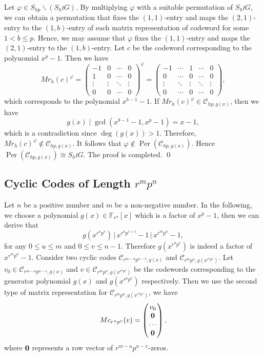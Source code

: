 \documentclass[journal,12pt,onecolumn]{IEEEtran}
\begin{document}
Let $\varphi\in S_{hp}\backslash(S_h \wr G)$. By multiplying $\varphi$ with a suitable permutation of $S_h \wr G$, we can obtain a permutation that fixes the $(1,1)$-entry and maps the $(2,1)$-entry to the $(1,b)$-entry of each matrix representation of codeword for some $1< b\le p$. Hence, we may assume that $\varphi$ fixes the $(1,1)$-entry and maps the $(2,1)$-entry to the $(1,b)$-entry. Let $c$ be the codeword corresponding to the polynomial $x^p-1$. Then we have 
\[
    Mr_{h}(c)^\varphi = \begin{pmatrix}
        -1 & 0 & \cdots & 0 \\
        1 & 0 & \cdots & 0 \\
        \vdots & \vdots & \ddots & \vdots \\
        0 & 0 & \cdots & 0
    \end{pmatrix}^\varphi = \begin{pmatrix}
        -1 & \cdots & 1 & \cdots & 0 \\
        0 & \cdots & 0 & \cdots & 0 \\
        \vdots & \ddots & \vdots & \ddots & \vdots \\
        0 & \cdots & 0 & \cdots & 0
    \end{pmatrix},
\]
which corresponds to the polynomial $x^{b-1}-1$. If $Mr_{h}(c)^\varphi\in \mathcal{C}_{hp,g(x)}$, then we have 
\[
    g(x)\mid \gcd(x^{b-1}-1,x^p-1) = x-1,
\]
which is a contradiction since $\deg(g(x))>1$. Therefore, $Mr_{h}(c)^\varphi\notin \mathcal{C}_{hp,g(x)}$. It follows that $\varphi\notin \operatorname{Per}(\mathcal{C}_{hp,g(x)})$. Hence $\operatorname{Per}(\mathcal{C}_{hp,g(x)})\cong S_h \wr G$. The proof is completed. \qed






\subsection{Cyclic Codes of Length $r^mp^n$}

Let $n$ be a positive number and $m$ be a non-negative number. In the following, we choose a polynomial $g(x)\in\mathbb{F}_{r^\alpha}[x]$ which is a factor of $x^p-1$, then we can derive that
\[
    g(x^{r^up^v})\,\big|\, x^{r^up^{v+1}}-1\,\big|\, x^{r^mp^n} - 1,
\]
for any $0\le u\le m$ and $0\le v\le n-1$. Therefore $g(x^{r^up^v})$ is indeed a factor of $x^{r^mp^n} - 1$. Consider two cyclic codes $\mathcal{C}_{r^{m-u}p^{n-v},g(x)}$ and $\mathcal{C}_{r^mp^n,g(x^{r^up^v})}$. Let $v_0\in\mathcal{C}_{r^{m-u}p^{n-v},g(x)}$ and $v\in\mathcal{C}_{r^mp^n,g(x^{r^up^v})}$ be the codewords corresponding to the generator polynomial $g(x)$ and $g(x^{r^up^v})$ respectively. Then we use the second type of matrix representation for $\mathcal{C}_{r^mp^n,g(x^{r^up^v})}$, we have
\[
    Mc_{r^up^v}(v) = \begin{pmatrix}
        v_0 \\
        {\bf 0} \\
        \cdots \\
        {\bf 0}
    \end{pmatrix},
\]
where ${\bf 0}$ represents a row vector of $r^{m-u}p^{n-v}$-zeros. 
\end{document}
